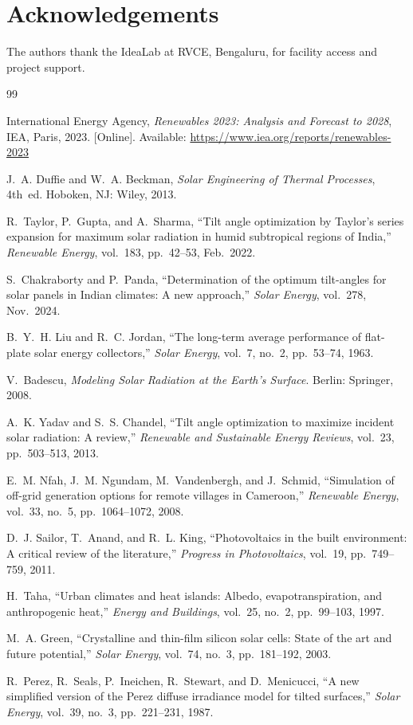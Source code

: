 \documentclass[conference]{IEEEtran}
\begin{document}
\section*{Acknowledgements}
The authors thank the IdeaLab at RVCE, Bengaluru, for facility access and project support.

\begin{thebibliography}{99}

International Energy Agency, \textit{Renewables 2023: Analysis and Forecast to 2028},
IEA, Paris, 2023. [Online]. Available: \url{https://www.iea.org/reports/renewables-2023}

J.~A. Duffie and W.~A. Beckman, \textit{Solar Engineering of Thermal Processes}, 4th~ed.
Hoboken, NJ: Wiley, 2013.

R.~Taylor, P.~Gupta, and A.~Sharma, ``Tilt angle optimization by Taylor's series expansion
for maximum solar radiation in humid subtropical regions of India,'' \textit{Renewable Energy},
vol.~183, pp.~42--53, Feb.~2022.

S.~Chakraborty and P.~Panda, ``Determination of the optimum tilt-angles for solar panels in
Indian climates: A new approach,'' \textit{Solar Energy}, vol.~278, Nov.~2024.

B.~Y.~H. Liu and R.~C. Jordan, ``The long-term average performance of flat-plate solar energy
collectors,'' \textit{Solar Energy}, vol.~7, no.~2, pp.~53--74, 1963.

V.~Badescu, \textit{Modeling Solar Radiation at the Earth's Surface}. Berlin: Springer, 2008.

A.~K. Yadav and S.~S. Chandel, ``Tilt angle optimization to maximize incident solar radiation:
A review,'' \textit{Renewable and Sustainable Energy Reviews}, vol.~23, pp.~503--513, 2013.

E.~M. Nfah, J.~M. Ngundam, M.~Vandenbergh, and J.~Schmid, ``Simulation of off-grid generation
options for remote villages in Cameroon,'' \textit{Renewable Energy}, vol.~33, no.~5,
pp.~1064--1072, 2008.

D.~J. Sailor, T.~Anand, and R.~L. King, ``Photovoltaics in the built environment: A critical
review of the literature,'' \textit{Progress in Photovoltaics}, vol.~19, pp.~749--759, 2011.

H.~Taha, ``Urban climates and heat islands: Albedo, evapotranspiration, and anthropogenic
heat,'' \textit{Energy and Buildings}, vol.~25, no.~2, pp.~99--103, 1997.

M.~A. Green, ``Crystalline and thin-film silicon solar cells: State of the art and future
potential,'' \textit{Solar Energy}, vol.~74, no.~3, pp.~181--192, 2003.

R.~Perez, R.~Seals, P.~Ineichen, R.~Stewart, and D.~Menicucci, ``A new simplified version
of the Perez diffuse irradiance model for tilted surfaces,'' \textit{Solar Energy}, vol.~39,
no.~3, pp.~221--231, 1987.

\end{thebibliography}
\end{document}
